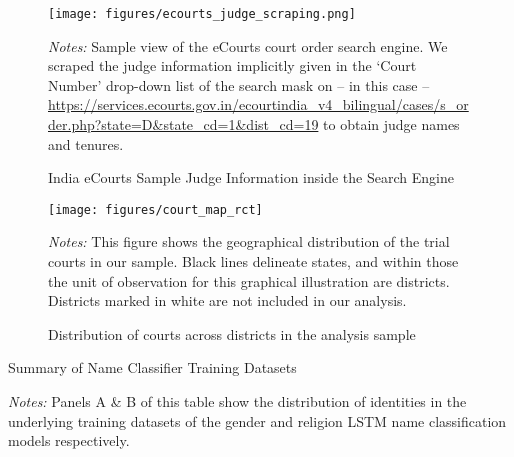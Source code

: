 \documentclass[12pt,english]{article}
\begin{document}
\begin{appendices}
\begin{figure}[htp!]
 \centering
 \caption{India eCourts Sample Judge Information inside the Search Engine}
 \texttt{[image: figures/ecourts\_judge\_scraping.png]}
 \label{fig:ecourts_judge_scraping}
 \begin{minipage}{1.0\textwidth}
    {\scriptsize \emph{Notes:} Sample view of the eCourts court order search engine. We scraped the judge information implicitly given in the `Court Number' drop-down list of the search mask on -- in this case -- \url{https://services.ecourts.gov.in/ecourtindia_v4_bilingual/cases/s_order.php?state=D&state_cd=1&dist_cd=19} to obtain judge names and tenures.\par}
 \end{minipage}
\end{figure}


\begin{figure}
    \centering
    \caption{Distribution of courts across districts in the analysis sample}
    \texttt{[image: figures/court\_map\_rct]} 
    \label{fig:court_maps}
     \begin{minipage}{1.0\textwidth}
    {\scriptsize \emph{Notes:} This figure shows the geographical distribution of the trial courts in our sample. Black lines delineate states, and within those the unit of observation for this graphical illustration are districts. Districts marked in white are not included in our analysis.\par}
 \end{minipage}
\end{figure}

\newpage

\begin{table}
  \begin{center}
  \caption{Summary of Name Classifier Training Datasets}
  \label{tab:training}
  
  \end{center}
   \begin{minipage}{1.0\textwidth}
    {\scriptsize \emph{Notes:} Panels A \& B of this table show the distribution of identities in the underlying training datasets of the gender and religion LSTM name classification models respectively.\par}
 \end{minipage}
\end{table}


\end{appendices}
\end{document}
